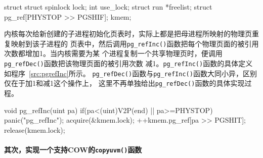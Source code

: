 \documentclass{swfcthesismscctex}
\begin{document}
\begin{listing}%
  \begin{codeblock}
\begin{ccode}
struct {
  struct spinlock lock;
  int use_lock;
  struct run *freelist;
  struct pg_ref[PHYSTOP >> PGSHIF];
} kmem;
\end{ccode}
  \end{codeblock}
  \label{src:kmem2}
\end{listing}

内核每次给新创建的子进程初始化页表时，实际上都是把母进程所映射的物理页重复映射到该子进程的
页表中，然后调用\texttt{pg\_refInc()}函数把每个物理页面的被引用次数都增加1。当内核需要为某
个进程复制一个共享物理页时，便调用\texttt{pg\_refDec()}函数把该物理页面的被引用次数
减1。\texttt{pg\_refInc()}函数的具体定义如程序~\ref{src:pgrefInc}所示。
\texttt{pg\_refDec()}函数与\texttt{pg\_refInc()}函数大同小异，区别仅在于加1和减1这个操作上，
这里不再单独给出\texttt{pg\_refDec()}函数的具体实现过程。

\begin{listing}%
  \begin{codeblock}
\begin{ccode}
void pg_refInc(uint pa) {
  if(pa<(uint)V2P(end) || pa>=PHYSTOP)
    panic("pg_refInc");
  acquire(&kmem.lock);
  ++kmem.pg_ref[pa >> PGSHIT];
  release(kmem.lock);
}
\end{ccode}
  \end{codeblock}
  \label{src:pgrefInc}
\end{listing}


\paragraph{其次，实现一个支持COW的\texttt{copyuvm()}函数}
\end{document}

